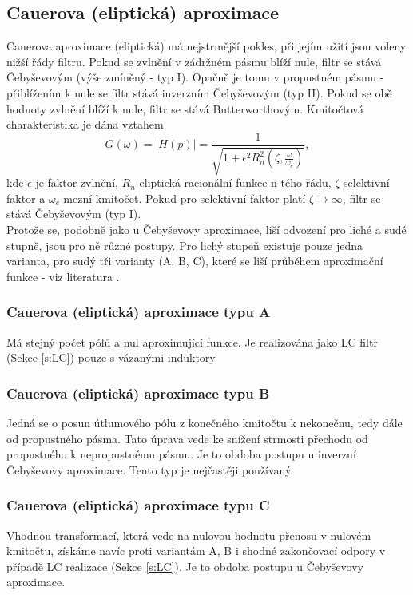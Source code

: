 \subsection{Cauerova (eliptická) aproximace}
\noindent Cauerova aproximace (eliptická) má nejstrmější pokles, při jejím užití jsou voleny nižší řády filtru. Pokud se zvlnění v zádržném pásmu blíží nule, filtr se stává Čebyševovým (výše zmíněný - typ I). Opačně je tomu v propustném pásmu - přiblížením k nule se filtr stává inverzním Čebyševovým (typ II).  Pokud se obě hodnoty zvlnění blíží k nule, filtr se stává Butterworthovým. Kmitočtová charakteristika je dána vztahem
\begin{equation}
G(\omega) = |H(p)| = \frac{1}{\sqrt{1 + \epsilon ^2 R_n ^2(\zeta, \frac{\omega}{\omega _c})}},
\end{equation}
kde $\epsilon$ je faktor zvlnění, $R_n$ eliptická racionální funkce n-tého řádu, $\zeta$ selektivní faktor a $\omega _c$ mezní kmitočet. Pokud pro selektivní faktor platí $\zeta \rightarrow \infty$, filtr se stává Čebyševovým (typ I).\\
Protože se, podobně jako u Čebyševovy aproximace, liší odvození pro liché a sudé stupně, jsou pro ně různé postupy. Pro lichý stupeň existuje pouze jedna varianta, pro sudý tři varianty (A, B, C), které se liší průběhem aproximační funkce - viz literatura \cite{10}.
\subsubsection{Cauerova (eliptická) aproximace typu A}
Má stejný počet pólů a nul aproximující funkce. Je realizována jako LC filtr (Sekce \ref{s:LC}) pouze s vázanými induktory.
\subsubsection{Cauerova (eliptická) aproximace typu B}
Jedná se o posun útlumového pólu z konečného kmitočtu k nekonečnu, tedy dále od propustného pásma. Tato úprava vede ke snížení strmosti přechodu od propustného k nepropustnému pásmu. Je to obdoba postupu u inverzní Čebyševovy aproximace. Tento typ je nejčastěji používaný.
\subsubsection{Cauerova (eliptická) aproximace typu C}
Vhodnou transformací, která vede na nulovou hodnotu přenosu v nulovém kmitočtu, získáme navíc proti variantám A, B i shodné zakončovací odpory v případě LC realizace (Sekce \ref{s:LC}). Je to obdoba postupu u Čebyševovy aproximace.
